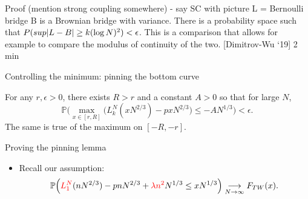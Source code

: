 \documentclass[9pt,t]{beamer}
\DeclarePairedDelimiter\abs{\lvert}{\rvert}
\begin{document}
\begin{frame}
Proof  (mention strong coupling somewhere) - say SC with picture 
L = Bernoulli bridge B is a Brownian bridge with variance. There is a probability space such that $P( sup \abs*{L - B} \geq k (\log N)^2) < \epsilon$. This is a comparison that allows for example to compare the modulus of continuity of the two. [Dimitrov-Wu ‘19]
2 min
\end{frame}

\begin{frame}{Controlling the minimum: pinning the bottom curve}
	
	\begin{lemma}[------]
		For any $r,\epsilon > 0$, there exists $R>r$ and a constant $A>0$ so that for large $N$,
		\[
		\mathbb{P}\Big(\max_{x\in[r,R]} \big(L_k^N(xN^{2/3}) - pxN^{2/3}\big) \leq -AN^{1/3}\Big) < \epsilon.
		\]
		The same is true of the maximum on $[-R,-r]$.
	\end{lemma}
	
	
	
\end{frame}

\begin{frame}{Proving the pinning lemma}
	
	\begin{itemize}
		
		\item Recall our assumption:
		\[
		\mathbb{P}\Big(\textcolor{red}{L_1^N}(nN^{2/3}) - pnN^{2/3} + \textcolor{red}{\lambda n^2} N^{1/3} \leq xN^{1/3}\Big) \underset{N\to\infty}\longrightarrow F_{TW}(x).
		\]
		
	\end{itemize}
\end{frame}
\end{document}

